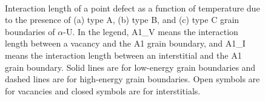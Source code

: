 \documentclass[review]{elsarticle}
\providecommand{\DIFaddbeginFL}{} %
\providecommand{\DIFaddendFL}{} %
\providecommand{\DIFdelbeginFL}{} %
\providecommand{\DIFdelendFL}{} %
\newcommand{\DIFscaledelfig}{0.5}
\newlength{\DIFdelgraphicswidth} %
\newlength{\DIFdelgraphicsheight} %
\newcommand{\DIFaddincludegraphics}[2][]{{\color{blue}\fbox{\DIFOincludegraphics[#1]{#2}}}} %
\newcommand{\DIFdelincludegraphics}[2][]{%
\sbox{\DIFdelgraphicsbox}{\DIFOincludegraphics[#1]{#2}}%
\settoboxwidth{\DIFdelgraphicswidth}{\DIFdelgraphicsbox} %
\settoboxtotalheight{\DIFdelgraphicsheight}{\DIFdelgraphicsbox} %
\scalebox{\DIFscaledelfig}{%
\parbox[b]{\DIFdelgraphicswidth}{\usebox{\DIFdelgraphicsbox}\\[-\baselineskip] \rule{\DIFdelgraphicswidth}{0em}}\llap{\resizebox{\DIFdelgraphicswidth}{\DIFdelgraphicsheight}{%
\setlength{\unitlength}{\DIFdelgraphicswidth}%
\begin{picture}(1,1)%
\thicklines\linethickness{2pt} %
{\color[rgb]{1,0,0}\put(0,0){\framebox(1,1){}}}%
{\color[rgb]{1,0,0}\put(0,0){\line( 1,1){1}}}%
{\color[rgb]{1,0,0}\put(0,1){\line(1,-1){1}}}%
\end{picture}%
}\hspace*{3pt}}} %
} %
\DeclareRobustCommand{\DIFaddbeginFL}{\DIFOaddbeginFL \let\includegraphics\DIFaddincludegraphics} %
\DeclareRobustCommand{\DIFaddendFL}{\DIFOaddendFL \let\includegraphics\DIFOincludegraphics} %
\DeclareRobustCommand{\DIFdelbeginFL}{\DIFOdelbeginFL \let\includegraphics\DIFdelincludegraphics} %
\DeclareRobustCommand{\DIFdelendFL}{\DIFOaddendFL \let\includegraphics\DIFOincludegraphics} %
\begin{document}
\begin{figure}[h!]
\centering
\DIFdelbeginFL %
\DIFdelendFL \DIFaddbeginFL {}
\DIFaddendFL \\
\caption{Interaction length of a point defect as a function of temperature due to the presence of (a) type A, (b) type B, and (c) type C grain boundaries of $\alpha$-U. In the legend, A1\_V means the interaction length between a vacancy and the A1 grain boundary, and A1\_I means the interaction length between an interstitial and the A1 grain boundary. Solid lines are for low-energy grain boundaries and dashed lines are for high-energy grain boundaries. Open symbols are for vacancies and closed symbols are for interstitials.}
\label{fig:Int}
\end{figure}
\end{document}
